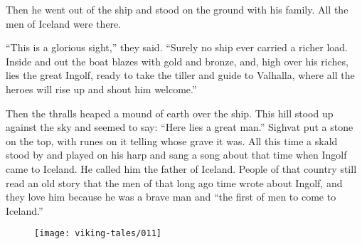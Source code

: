 Then he went out of the ship and stood on the ground with his family.
All the men of Iceland were there.

``This is a glorious sight,'' they said. ``Surely no ship ever carried a
richer load. Inside and out the boat blazes with gold and bronze, and,
high over his riches, lies the great Ingolf, ready to take the tiller
and guide to Valhalla, where all the heroes will rise up and shout him
welcome.''

Then the thralls heaped a mound of earth over the ship. This hill stood
up against the sky and seemed to say: ``Here lies a great man.'' Sighvat
put a stone on the top, with runes on it telling whose grave it was. All
this time a skald stood by and played on his harp and sang a song about
that time when Ingolf came to Iceland. He called him the father of
Iceland. People of that country still read an old story that the men of
that long ago time wrote about Ingolf, and they love him because he was
a brave man and ``the first of men to come to Iceland.''

\begin{figure}[hb]
    \centering
    \vskip8pt
    \texttt{[image: viking-tales/011]}
\end{figure}
